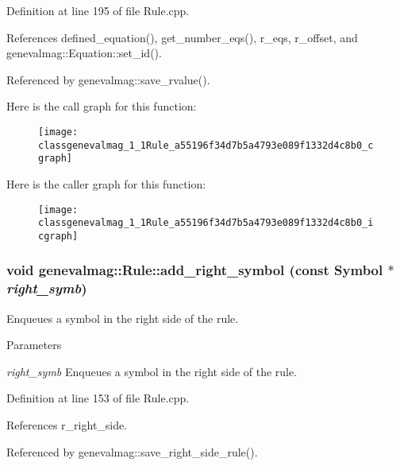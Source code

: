Definition at line 195 of file Rule.cpp.



References defined\_\-equation(), get\_\-number\_\-eqs(), r\_\-eqs, r\_\-offset, and genevalmag::Equation::set\_\-id().



Referenced by genevalmag::save\_\-rvalue().



Here is the call graph for this function:\nopagebreak
\begin{figure}[H]
\begin{center}
\leavevmode
\texttt{[image: classgenevalmag\_1\_1Rule\_a55196f34d7b5a4793e089f1332d4c8b0\_cgraph]}
\end{center}
\end{figure}




Here is the caller graph for this function:\nopagebreak
\begin{figure}[H]
\begin{center}
\leavevmode
\texttt{[image: classgenevalmag\_1\_1Rule\_a55196f34d7b5a4793e089f1332d4c8b0\_icgraph]}
\end{center}
\end{figure}


\hypertarget{classgenevalmag_1_1Rule_aad3d9a79889338ef270de09fcbf91729}{
\subsubsection[{add\_\-right\_\-symbol}]{\setlength{\rightskip}{0pt plus 5cm}void genevalmag::Rule::add\_\-right\_\-symbol (const {\bf Symbol} $\ast$ {\em right\_\-symb})}}
\label{classgenevalmag_1_1Rule_aad3d9a79889338ef270de09fcbf91729}
Enqueues a symbol in the right side of the rule. 
\begin{DoxyParams}{Parameters}
\item[{\em right\_\-symb}]Enqueues a symbol in the right side of the rule. \end{DoxyParams}


Definition at line 153 of file Rule.cpp.



References r\_\-right\_\-side.



Referenced by genevalmag::save\_\-right\_\-side\_\-rule().



